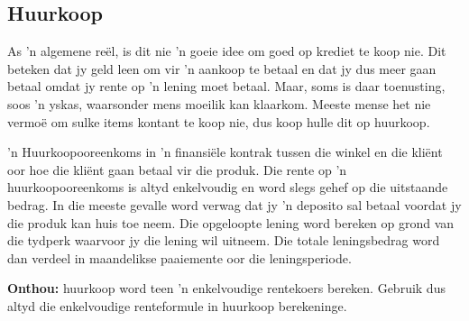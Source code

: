 \subsection{Huurkoop}

As 'n algemene re\"el, is dit nie 'n goeie idee om goed op krediet te koop nie. Dit beteken dat jy geld leen om vir 'n aankoop te betaal en dat jy dus meer gaan betaal omdat jy rente op 'n lening moet betaal. Maar, soms is daar toenusting, soos 'n yskas, waarsonder mens moeilik kan klaarkom. Meeste mense het nie vermo\"e om sulke items kontant te koop nie, dus koop hulle dit op huurkoop.\par

'n Huurkoopooreenkoms in 'n finansi\"ele kontrak tussen die winkel en die kli\"ent oor hoe die kli\"ent gaan betaal vir die produk. Die rente op 'n huurkoopooreenkoms is altyd enkelvoudig en word slegs gehef op die uitstaande bedrag. In die meeste gevalle word verwag dat jy 'n deposito sal betaal voordat jy die produk kan huis toe neem. Die opgeloopte lening word bereken op grond van die tydperk waarvoor jy die lening wil uitneem. Die totale leningsbedrag word dan verdeel in maandelikse paaiemente oor die leningsperiode.

\par
\textbf{Onthou:} huurkoop word teen 'n enkelvoudige rentekoers bereken. Gebruik dus altyd die enkelvoudige renteformule in huurkoop berekeninge.

